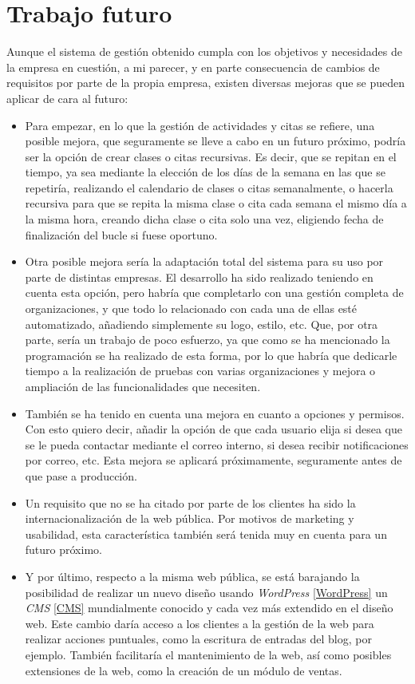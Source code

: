 \section{Trabajo futuro}

Aunque el sistema de gestión obtenido cumpla con los objetivos y necesidades de la empresa en cuestión, a mi parecer, y en parte consecuencia de cambios de requisitos por parte de la propia empresa, existen diversas mejoras que se pueden aplicar de cara al futuro: 

\begin{itemize}
\item Para empezar, en lo que la gestión de actividades y citas se refiere, una posible mejora, que seguramente se lleve a cabo en un futuro próximo, podría ser la opción de crear clases o citas recursivas. Es decir, que se repitan en el tiempo, ya sea mediante la elección de los días de la semana en las que se repetiría, realizando el calendario de clases o citas semanalmente, o hacerla recursiva para que se repita la misma clase o cita cada semana el mismo día a la misma hora, creando dicha clase o cita solo una vez, eligiendo fecha de finalización del bucle si fuese oportuno.
\item Otra posible mejora sería la adaptación total del sistema para su uso por parte de distintas empresas. El desarrollo ha sido realizado teniendo en cuenta esta opción, pero habría que completarlo con una gestión completa de organizaciones, y que todo lo relacionado con cada una de ellas esté automatizado, añadiendo simplemente su logo, estilo, etc. Que, por otra parte, sería un trabajo de poco esfuerzo, ya que como se ha mencionado la programación se ha realizado de esta forma, por lo que habría que dedicarle tiempo a la realización de pruebas con varias organizaciones y mejora o ampliación de las funcionalidades que necesiten.
\item También se ha tenido en cuenta una mejora en cuanto a opciones y permisos. Con esto quiero decir, añadir la opción de que cada usuario elija si desea que se le pueda contactar mediante el correo interno, si desea recibir notificaciones por correo, etc. Esta mejora se aplicará próximamente, seguramente antes de que pase a producción. 
\item Un requisito que no se ha citado por parte de los clientes ha sido la internacionalización de la web pública. Por motivos de marketing y usabilidad, esta característica también será tenida muy en cuenta para un futuro próximo.
\item Y por último, respecto a la misma web pública, se está barajando la posibilidad de realizar un nuevo diseño usando \textit{WordPress} \ref{WordPress} un \textit{CMS} \ref{CMS} mundialmente conocido y cada vez más extendido en el diseño web. Este cambio daría acceso a los clientes a la gestión de la web para realizar acciones puntuales, como la escritura de entradas del blog, por ejemplo. También facilitaría el mantenimiento de la web, así como posibles extensiones de la web, como la creación de un módulo de ventas. 
\end{itemize}


